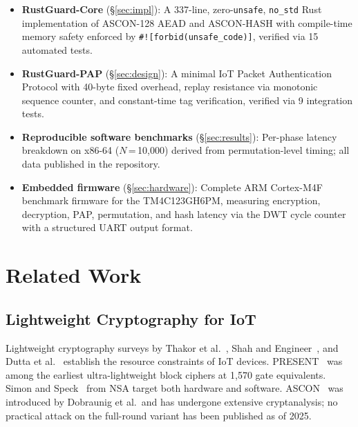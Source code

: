 \documentclass[anonymous]{ndss}
\newcommand{\code}[1]{\mbox{\texttt{#1}}}
\newcommand{\nstd}{\texttt{no\_std}}
\newcommand{\forbid}{\code{\#![forbid(unsafe\_code)]}}
\begin{document}
\begin{itemize}
\item \textbf{RustGuard-Core} (\S\ref{sec:impl}): A 337-line,
      zero-\texttt{unsafe}, \nstd{} Rust implementation of ASCON-128
      AEAD and ASCON-HASH with compile-time memory safety enforced by
      \forbid{}, verified via 15 automated tests.

\item \textbf{RustGuard-PAP} (\S\ref{sec:design}): A minimal IoT Packet
      Authentication Protocol with 40-byte fixed overhead, replay resistance
      via monotonic sequence counter, and constant-time tag verification,
      verified via 9 integration tests.

\item \textbf{Reproducible software benchmarks} (\S\ref{sec:results}):
      Per-phase latency breakdown on x86-64 ($N$\,=\,10{,}000) derived from
      permutation-level timing; all data published in the repository.

\item \textbf{Embedded firmware} (\S\ref{sec:hardware}): Complete ARM
      Cortex-M4F benchmark firmware for the TM4C123GH6PM, measuring
      encryption, decryption, PAP, permutation, and hash latency via the
      DWT cycle counter with a structured UART output format.
\end{itemize}

\section{Related Work}
\label{sec:related}

\subsection{Lightweight Cryptography for IoT}

Lightweight cryptography surveys by Thakor et al.~\cite{b6},
Shah and Engineer~\cite{b7}, and Dutta et al.~\cite{b8} establish the
resource constraints of IoT devices. PRESENT~\cite{b3} was among the
earliest ultra-lightweight block ciphers at 1{,}570 gate equivalents.
Simon and Speck~\cite{b4} from NSA target both hardware and software.
ASCON~\cite{b9} was introduced by Dobraunig et al.\ and has undergone
extensive cryptanalysis; no practical attack on the full-round variant
has been published as of 2025.
\end{document}
